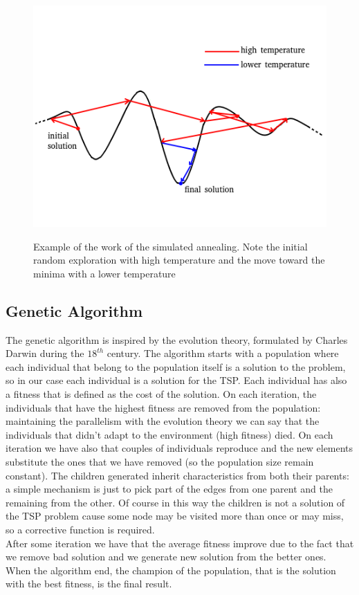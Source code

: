 \begin{figure}[h!]
\centering
	\includegraphics[scale=0.8]{media/SimulatedAnnealing.png} \\
	\caption{Example of the work of the simulated annealing. Note the initial random exploration with high temperature and the move toward the minima with a lower temperature}
\end{figure}


\subsection{Genetic Algorithm}
The genetic algorithm is inspired by the evolution theory, formulated by Charles Darwin during the $18^{th}$ century. 
The algorithm starts with a population where each individual that belong to the population itself is a solution to the problem, so in our case each individual is a solution for the TSP. Each individual has also a fitness that is defined as the cost of the solution. On each iteration, the individuals that have the highest fitness are removed from the population: maintaining the parallelism with the evolution theory we can say that the individuals that didn't adapt to the environment (high fitness) died.
On each iteration we have also that couples of individuals reproduce and the new elements substitute the ones that we have removed (so the population size remain constant). The children generated inherit characteristics from both their parents: a simple mechanism is just to pick part of the edges from one parent and the remaining from the other. Of course in this way the children is not a solution of the TSP problem cause some node may be visited more than once or may miss, so a corrective function is required. \\
After some iteration we have that the average fitness improve due to the fact that we remove bad solution and we generate new solution from the better ones. When the algorithm end, the champion of the population, that is the solution with the best fitness, is the final result. \\

